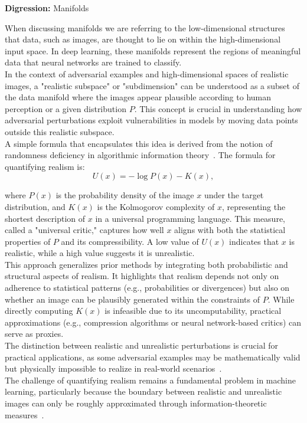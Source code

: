 \documentclass[a4paper, oneside]{discothesis}
\begin{document}
\begin{highlightbox}
	\textbf{Digression:} Manifolds 

	When discussing manifolds we are referring to the low-dimensional structures that data, such as images, are thought to lie on within the high-dimensional input space. In deep learning, these manifolds represent the regions of meaningful data that neural networks are trained to classify.  \\

	In the context of adversarial examples and high-dimensional spaces of realistic images, a "realistic subspace" or "subdimension" can be understood as a subset of the data manifold where the images appear plausible according to human perception or a given distribution $P$. This concept is crucial in understanding how adversarial perturbations exploit vulnerabilities in models by moving data points outside this realistic subspace. \\

	A simple formula that encapsulates this idea is derived from the notion of randomness deficiency in algorithmic information theory~\cite{theis2024makes}. The formula for quantifying realism is: \\

	$$
	U(x) = -\log P(x) - K(x),
	$$

	where $ P(x) $ is the probability density of the image $ x $ under the target distribution, and $ K(x) $ is the Kolmogorov complexity of $ x $, representing the shortest description of $ x $ in a universal programming language. This measure, called a "universal critic," captures how well $ x $ aligns with both the statistical properties of $ P $ and its compressibility. A low value of $ U(x) $ indicates that $ x $ is realistic, while a high value suggests it is unrealistic. \\

	This approach generalizes prior methods by integrating both probabilistic and structural aspects of realism. It highlights that realism depends not only on adherence to statistical patterns (e.g., probabilities or divergences) but also on whether an image can be plausibly generated within the constraints of $ P $. While directly computing $ K(x) $ is infeasible due to its uncomputability, practical approximations (e.g., compression algorithms or neural network-based critics) can serve as proxies. \\

	The distinction between realistic and unrealistic perturbations is crucial for practical applications, as some adversarial examples may be mathematically valid but physically impossible to realize in real-world scenarios~\cite{dyrmishi2023empirical}. \\
	
	The challenge of quantifying realism remains a fundamental problem in machine learning, particularly because the boundary between realistic and unrealistic images can only be roughly approximated through information-theoretic measures~\cite{theis2024makes}.

\end{highlightbox}
\end{document}
